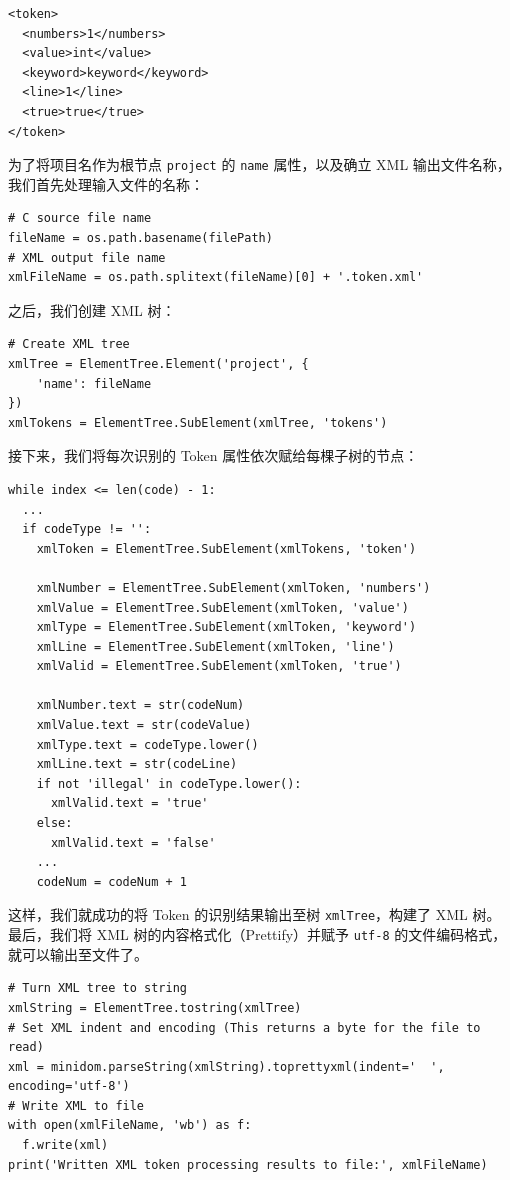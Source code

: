 \documentclass[UTF8]{ctexart}
\begin{document}
\begin{verbatim}
<token>
  <numbers>1</numbers>
  <value>int</value>
  <keyword>keyword</keyword>
  <line>1</line>
  <true>true</true>
</token>
\end{verbatim}

为了将项目名作为根节点 \texttt{project} 的 \texttt{name} 属性，以及确立 XML 输出文件名称，我们首先处理输入文件的名称：

\begin{verbatim}
# C source file name
fileName = os.path.basename(filePath)
# XML output file name
xmlFileName = os.path.splitext(fileName)[0] + '.token.xml'
\end{verbatim}

之后，我们创建 XML 树：

\begin{verbatim}
# Create XML tree
xmlTree = ElementTree.Element('project', {
    'name': fileName
})
xmlTokens = ElementTree.SubElement(xmlTree, 'tokens')
\end{verbatim}

接下来，我们将每次识别的 Token 属性依次赋给每棵子树的节点：

\begin{verbatim}
while index <= len(code) - 1:
  ...
  if codeType != '':
    xmlToken = ElementTree.SubElement(xmlTokens, 'token')

    xmlNumber = ElementTree.SubElement(xmlToken, 'numbers')
    xmlValue = ElementTree.SubElement(xmlToken, 'value')
    xmlType = ElementTree.SubElement(xmlToken, 'keyword')
    xmlLine = ElementTree.SubElement(xmlToken, 'line')
    xmlValid = ElementTree.SubElement(xmlToken, 'true')

    xmlNumber.text = str(codeNum)
    xmlValue.text = str(codeValue)
    xmlType.text = codeType.lower()
    xmlLine.text = str(codeLine)
    if not 'illegal' in codeType.lower():
      xmlValid.text = 'true'
    else:
      xmlValid.text = 'false'
    ...
    codeNum = codeNum + 1
\end{verbatim}

这样，我们就成功的将 Token 的识别结果输出至树 \texttt{xmlTree}，构建了 XML 树。最后，我们将 XML 树的内容格式化（Prettify）并赋予 \texttt{utf-8} 的文件编码格式，就可以输出至文件了。

\begin{verbatim}
# Turn XML tree to string
xmlString = ElementTree.tostring(xmlTree)
# Set XML indent and encoding (This returns a byte for the file to read)
xml = minidom.parseString(xmlString).toprettyxml(indent='  ', encoding='utf-8')
# Write XML to file
with open(xmlFileName, 'wb') as f:
  f.write(xml)
print('Written XML token processing results to file:', xmlFileName)
\end{verbatim}
\end{document}
